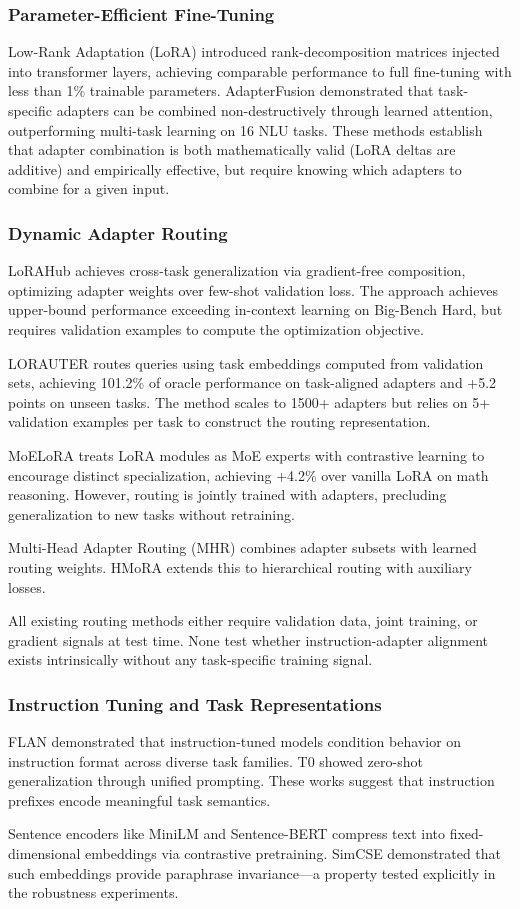 
\subsubsection{Parameter-Efficient Fine-Tuning}

Low-Rank Adaptation (LoRA) introduced rank-decomposition matrices injected into transformer layers, achieving comparable performance to full fine-tuning with less than 1\% trainable parameters. AdapterFusion demonstrated that task-specific adapters can be combined non-destructively through learned attention, outperforming multi-task learning on 16 NLU tasks. These methods establish that adapter combination is both mathematically valid (LoRA deltas are additive) and empirically effective, but require knowing which adapters to combine for a given input.

\subsubsection{Dynamic Adapter Routing}

LoRAHub achieves cross-task generalization via gradient-free composition, optimizing adapter weights over few-shot validation loss. The approach achieves upper-bound performance exceeding in-context learning on Big-Bench Hard, but requires validation examples to compute the optimization objective.

LORAUTER routes queries using task embeddings computed from validation sets, achieving 101.2\% of oracle performance on task-aligned adapters and +5.2 points on unseen tasks. The method scales to 1500+ adapters but relies on 5+ validation examples per task to construct the routing representation.

MoELoRA treats LoRA modules as MoE experts with contrastive learning to encourage distinct specialization, achieving +4.2\% over vanilla LoRA on math reasoning. However, routing is jointly trained with adapters, precluding generalization to new tasks without retraining.

Multi-Head Adapter Routing (MHR) combines adapter subsets with learned routing weights. HMoRA extends this to hierarchical routing with auxiliary losses.

All existing routing methods either require validation data, joint training, or gradient signals at test time. None test whether instruction-adapter alignment exists intrinsically without any task-specific training signal.

\subsubsection{Instruction Tuning and Task Representations}

FLAN demonstrated that instruction-tuned models condition behavior on instruction format across diverse task families. T0 showed zero-shot generalization through unified prompting. These works suggest that instruction prefixes encode meaningful task semantics.

Sentence encoders like MiniLM and Sentence-BERT compress text into fixed-dimensional embeddings via contrastive pretraining. SimCSE demonstrated that such embeddings provide paraphrase invariance---a property tested explicitly in the robustness experiments.
